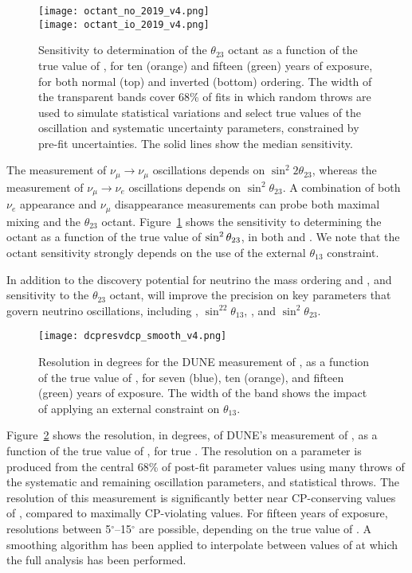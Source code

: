 \begin{figure}[htbp]
  \centering
  \texttt{[image: octant\_no\_2019\_v4.png]}\\
  \texttt{[image: octant\_io\_2019\_v4.png]}
  \caption[Sensitivity of determination of the $\theta_{23}$ octant as a function of  in both  and ]{Sensitivity to determination of the $\theta_{23}$ octant as a function of the true value of , for ten (orange) and fifteen (green) years of exposure, for both normal (top) and inverted (bottom) ordering. The width of the transparent bands cover 68\% of fits in which random throws are used to simulate statistical variations and select true values of the oscillation and systematic uncertainty parameters, constrained by pre-fit uncertainties. The solid lines show the median sensitivity.}
    \label{fig:lbloctant}
\end{figure}
The measurement of $\nu_\mu \rightarrow \nu_\mu$ oscillations depends on $\sin ^2 2 \theta_{23}$, whereas the measurement of $\nu_\mu \rightarrow \nu_e$ oscillations depends on $\sin^2 \theta_{23}$.  A combination of both $\nu_e$ appearance and $\nu_\mu$ disappearance measurements can probe both maximal mixing and
the $\theta_{23}$ octant.  
Figure~\ref{fig:lbloctant} shows the sensitivity to determining the octant as a function of the true value of $\sin^2\theta_{23}$, in both  and . We note that the octant sensitivity strongly depends on the use of the external $\theta_{13}$ constraint.

In addition to the discovery potential for neutrino the mass ordering and , and sensitivity to the $\theta_{23}$ octant,  
 will improve the precision on key parameters that govern neutrino oscillations, including \deltacp, $\sin^22\theta_{13}$, , and $\sin^2\theta_{23}$.

\begin{figure}[htbp]
    \centering
    \texttt{[image: dcpresvdcp\_smooth\_v4.png]}
    \caption[Resolution for the DUNE measurement of \deltacp as a function of \deltacp]
	    {Resolution in degrees for the DUNE measurement of \deltacp, as a function of the true value of \deltacp, for seven (blue), ten (orange), and fifteen (green) years of exposure. The width of the band shows the impact of applying an external constraint on $\theta_{13}$.}
    \label{fig:dcpresvdcp}
\end{figure}
Figure~\ref{fig:dcpresvdcp} shows the resolution, in degrees, of DUNE's measurement of \deltacp, as a function of the true value of \deltacp, for true . The resolution on a parameter is produced from the central 68\% of post-fit parameter values using many throws of the systematic and remaining oscillation parameters, and statistical throws. The resolution of this measurement is significantly better near CP-conserving values of \deltacp, compared to maximally CP-violating values. For fifteen years of exposure, resolutions between 5$^{\circ}$--15$^{\circ}$ are possible, depending on the true value of \deltacp. A smoothing algorithm has been applied to interpolate between values of \deltacp at which the full analysis has been performed.

